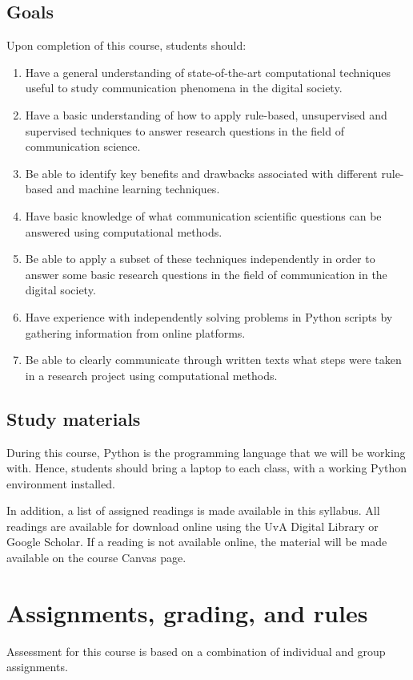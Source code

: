 \documentclass[a4paper,10pt]{report}
\begin{document}
	\section{Goals}
	Upon completion of this course, students should:
	\begin{enumerate}[a]
		\item Have a general understanding of state-of-the-art computational techniques useful to study communication phenomena in the digital society.
		\item Have a basic understanding of how to apply rule-based, unsupervised and supervised techniques to answer research questions in the field of communication science.
		\item Be able to identify key benefits and drawbacks associated with different rule-based and machine learning techniques.
		\item Have basic knowledge of what communication scientific questions can be answered using computational methods.
		\item Be able to apply a subset of these techniques independently in order to answer some basic research questions in the field of communication in the digital society.
		\item Have experience with independently solving problems in Python scripts by gathering information from online platforms.
		\item Be able to clearly communicate through written texts what steps were taken in a research project using computational methods.
	\end{enumerate}

	\section{Study materials}
	During this course, Python is the programming language that we will be working with. Hence, students should bring a laptop to each class, with a working Python environment installed.  
	
	In addition, a list of assigned readings is made available in this syllabus. All readings are available for download online using the UvA Digital Library or Google Scholar. If a reading is not available online, the material will be made available on the course Canvas page.
	
	
\chapter{Assignments, grading, and rules}
Assessment for this course is based on a combination of individual and group assignments. 
	
\end{document}
